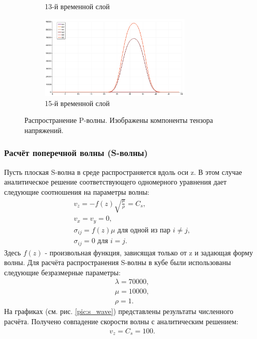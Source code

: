 \begin{figure}[htp]
\begin{subfigure}[b]{0.5\textwidth}
\caption{13-й временной слой}
\end{subfigure}
\begin{subfigure}[b]{0.5\textwidth}
\centering
\includegraphics[width=0.8\textwidth]{png/p-wave-test/s/0015.png}
\caption{15-й временной слой}
\end{subfigure}
\caption{Распространение P-волны. Изображены компоненты тензора напряжений.}
\label{pic:p_wave}
\end{figure}


\subsubsection{Расчёт поперечной волны (S-волны)}
Пусть плоская S-волна в среде распространяется вдоль оси z. В этом случае аналитическое решение соответствующего одномерного уравнения дает следующие соотношения на параметры волны:
\begin{eqnarray}
v_z=-f(z)\sqrt{\frac{\mu}{\rho}}=C_s, \nonumber\\
v_x=v_y=0, \nonumber\\
\sigma_{ij}=f(z)\mu \textrm{ для одной из пар } i \neq j, \nonumber\\
\sigma_{ij}=0 \textrm{ для } i = j.
\end{eqnarray}
Здесь $f(z)$ - произвольная функция, зависящая только от z и задающая форму волны.
Для расчёта распространения S-волны в кубе были использованы следующие безразмерные параметры: 
\begin{eqnarray}
\lambda=70000, \nonumber\\
\mu=10000, \nonumber\\
\rho=1.
\end{eqnarray}
На графиках (см. рис. \ref{pic:s_wave}) представлены результаты численного расчёта. Получено совпадение скорости волны с аналитическим решением:
\begin{eqnarray}
v_z=C_s=100.
\end{eqnarray}

